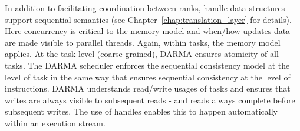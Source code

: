 In addition to facilitating coordination between \glspl{rank}, \gls{handle} data structures 
support \gls{sequential semantics} (see Chapter~\ref{chap:translation_layer} for details).
Here concurrency is critical to the \gls{memory model} and when/how updates data are made visible to parallel threads.  
Again, within \glspl{task}, the \CC{} \gls{memory model} applies. 
At the \gls{task}-level (coarse-grained), \gls{DARMA} ensures atomicity of all
\glspl{task}. 
The \gls{DARMA} scheduler   enforces the \CC{} sequential consistency model at
the level of \gls{task} in the same way that \CC{} ensures sequential consistency at the level of instructions. 
\gls{DARMA} understands read/write usages of \glspl{task} and ensures that writes are always visible to subsequent reads - and reads always complete before subsequent writes.  
The use of \glspl{handle} enables this to happen automatically within an
\gls{execution stream}.




